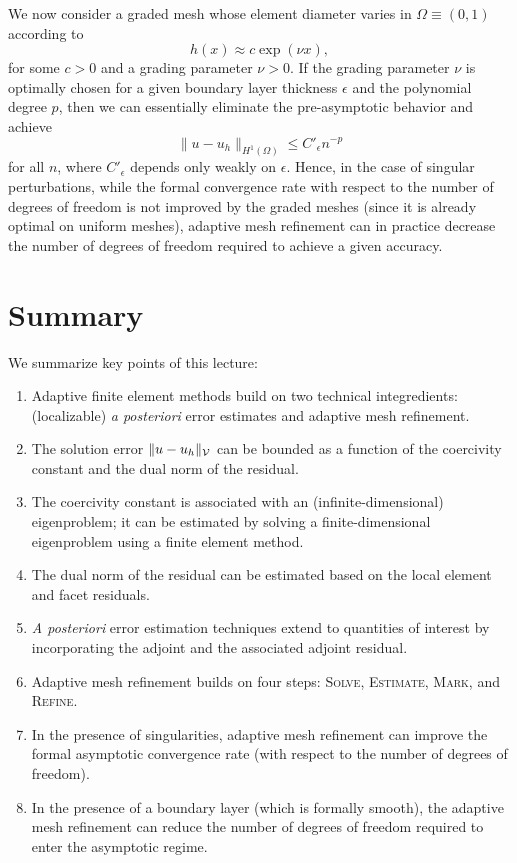 We now consider a graded mesh whose element diameter varies in $\Omega \equiv (0,1)$ according to
\begin{equation*}
  h(x) \approx c \exp(\nu x),
\end{equation*}
for some $c > 0$ and a grading parameter $\nu > 0$.  If the grading parameter $\nu$ is optimally chosen for a given boundary layer thickness $\epsilon$ and the polynomial degree $p$, then we can essentially eliminate the pre-asymptotic behavior and achieve
\begin{equation*}
  \| u - u_h \|_{H^1(\Omega)} \leq C'_{\epsilon} n^{-p}
\end{equation*}
for all $n$, where $C'_{\epsilon}$ depends only weakly on $\epsilon$. Hence, in the case of singular perturbations, while the formal convergence rate with respect to the number of degrees of freedom is not improved by the graded meshes (since it is already optimal on uniform meshes), adaptive mesh refinement can in practice decrease the number of degrees of freedom required to achieve a given accuracy.

\section{Summary}
We summarize key points of this lecture:
\begin{enumerate}
\item Adaptive finite element methods build on two technical integredients: (localizable) \emph{a posteriori} error estimates and adaptive mesh refinement.
\item The solution error $\| u - u_h \|_{\mathcal{V}}$ can be bounded as a function of the coercivity constant and the dual norm of the residual.
\item The coercivity constant is associated with an (infinite-dimensional) eigenproblem; it can be estimated by solving a finite-dimensional eigenproblem using a finite element method.
\item The dual norm of the residual can be estimated based on the local element and facet residuals.
\item \emph{A posteriori} error estimation techniques extend to quantities of interest by incorporating the adjoint and the associated adjoint residual.
\item Adaptive mesh refinement builds on four steps: \textsc{Solve}, \textsc{Estimate}, \textsc{Mark}, and \textsc{Refine}.
\item In the presence of singularities, adaptive mesh refinement can improve the formal asymptotic convergence rate (with respect to the number of degrees of freedom).
\item In the presence of a boundary layer (which is formally smooth), the adaptive mesh refinement can reduce the number of degrees of freedom required to enter the asymptotic regime.
\end{enumerate}

